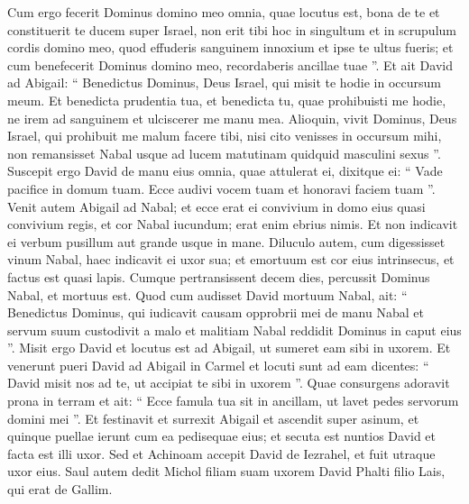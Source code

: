 \begin{biblechapter}
\begin{biblechapter}
\begin{biblechapter}
\begin{biblechapter}
\begin{biblechapter}
\begin{biblechapter}
\begin{biblechapter}
\begin{biblechapter}
\begin{biblechapter}
\begin{biblechapter}
\begin{biblechapter}
\begin{biblechapter}
\begin{biblechapter}
\begin{biblechapter}
\begin{biblechapter}
\begin{biblechapter}
\begin{biblechapter}
\begin{biblechapter}
\begin{biblechapter}
\begin{biblechapter}
\begin{biblechapter}
\begin{biblechapter}
\begin{biblechapter}
\begin{biblechapter}
\begin{biblechapter}
\verse Cum ergo fecerit Dominus domino meo omnia, quae locutus est, bona de te et constituerit te ducem super Israel, 
\verse non erit tibi hoc in singultum et in scrupulum cordis domino meo, quod effuderis sanguinem innoxium et ipse te ultus fueris; et cum benefecerit Dominus domino meo, recordaberis ancillae tuae ”.
 \verse Et ait David ad Abigail: “ Benedictus Dominus, Deus Israel, qui misit te hodie in occursum meum. Et benedicta prudentia tua, 
\verse et benedicta tu, quae prohibuisti me hodie, ne irem ad sanguinem et ulciscerer me manu mea. 
\verse Alioquin, vivit Dominus, Deus Israel, qui prohibuit me malum facere tibi, nisi cito venisses in occursum mihi, non remansisset Nabal usque ad lucem matutinam quidquid masculini sexus ”. 
\verse Suscepit ergo David de manu eius omnia, quae attulerat ei, dixitque ei: “ Vade pacifice in domum tuam. Ecce audivi vocem tuam et honoravi faciem tuam ”.
 \verse Venit autem Abigail ad Nabal; et ecce erat ei convivium in domo eius quasi convivium regis, et cor Nabal iucundum; erat enim ebrius nimis. Et non indicavit ei verbum pusillum aut grande usque in mane. 
\verse Diluculo autem, cum digessisset vinum Nabal, haec indicavit ei uxor sua; et emortuum est cor eius intrinsecus, et factus est quasi lapis. 
\verse Cumque pertransissent decem dies, percussit Dominus Nabal, et mortuus est.
 \verse Quod cum audisset David mortuum Nabal, ait: “ Benedictus Dominus, qui iudicavit causam opprobrii mei de manu Nabal et servum suum custodivit a malo et malitiam Nabal reddidit Dominus in caput eius ”.
 Misit ergo David et locutus est ad Abigail, ut sumeret eam sibi in uxorem. 
 \verse Et venerunt pueri David ad Abigail in Carmel et locuti sunt ad eam dicentes: “ David misit nos ad te, ut accipiat te sibi in uxorem ”. 
\verse Quae consurgens adoravit prona in terram et ait: “ Ecce famula tua sit in ancillam, ut lavet pedes servorum domini mei ”. 
\verse Et festinavit et surrexit Abigail et ascendit super asinum, et quinque puellae ierunt cum ea pedisequae eius; et secuta est nuntios David et facta est illi uxor.
 \verse Sed et Achinoam accepit David de Iezrahel, et fuit utraque uxor eius. 
\verse Saul autem dedit Michol filiam suam uxorem David Phalti filio Lais, qui erat de Gallim.
 

\end{biblechapter}
\end{biblechapter}
\end{biblechapter}
\end{biblechapter}
\end{biblechapter}
\end{biblechapter}
\end{biblechapter}
\end{biblechapter}
\end{biblechapter}
\end{biblechapter}
\end{biblechapter}
\end{biblechapter}
\end{biblechapter}
\end{biblechapter}
\end{biblechapter}
\end{biblechapter}
\end{biblechapter}
\end{biblechapter}
\end{biblechapter}
\end{biblechapter}
\end{biblechapter}
\end{biblechapter}
\end{biblechapter}
\end{biblechapter}
\end{biblechapter}
